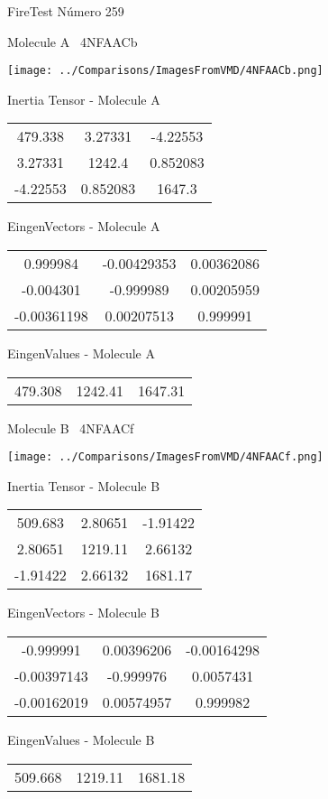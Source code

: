 \vtab[-3cm]
\begin{center}
{\large FireTest \tab Número 259}
\end{center}
\begin{multicols}{2}
\begin{center}

Molecule A \
4NFAACb

\texttt{[image: ../Comparisons/ImagesFromVMD/4NFAACb.png]}

Inertia Tensor - Molecule A \\
\begin{tabular}{|c c c|}
479.338	 & 	3.27331	 & 	-4.22553	 \\
3.27331	 & 	1242.4	 & 	0.852083	 \\
-4.22553	 & 	0.852083	 & 	1647.3
\end{tabular}

\vtab
 EingenVectors - Molecule A     \\
\begin{tabular}{|c c c|}
0.999984	 & 	-0.00429353	 & 	0.00362086	 \\
-0.004301	 & 	-0.999989	 & 	0.00205959	 \\
-0.00361198	 & 	0.00207513	 & 	0.999991
\end{tabular}

\vtab
 EingenValues - Molecule A     \\
\begin{tabular}{|c c c|}
479.308	 & 	1242.41	 & 	1647.31	 \\
\end{tabular}
\columnbreak

Molecule B \
4NFAACf

\texttt{[image: ../Comparisons/ImagesFromVMD/4NFAACf.png]}

Inertia Tensor - Molecule B \\
\begin{tabular}{|c c c|}
509.683	 & 	2.80651	 & 	-1.91422	 \\
2.80651	 & 	1219.11	 & 	2.66132	 \\
-1.91422	 & 	2.66132	 & 	1681.17
\end{tabular}

\vtab
 EingenVectors - Molecule B     \\
\begin{tabular}{|c c c|}
-0.999991	 & 	0.00396206	 & 	-0.00164298	 \\
-0.00397143	 & 	-0.999976	 & 	0.0057431	 \\
-0.00162019	 & 	0.00574957	 & 	0.999982
\end{tabular}

\vtab
 EingenValues - Molecule B     \\
\begin{tabular}{|c c c|}
509.668	 & 	1219.11	 & 	1681.18	 \\
\end{tabular}

\end{center}
\end{multicols}

